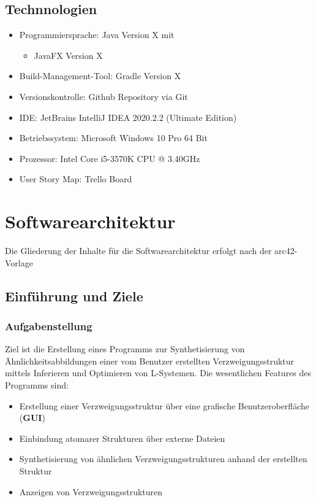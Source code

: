 \documentclass[11pt]{article}
\begin{document}
    \subsection{Technnologien}
    \begin{itemize}
        \item Programmiersprache: Java Version X mit
        \begin{itemize}
            \item JavaFX Version X
        \end{itemize}
        \item Build-Management-Tool: Gradle\cite{gradle} Version X
        \item Versionskontrolle: Github Repository\cite{github} via Git\cite{git}
        \item IDE: JetBrains IntelliJ IDEA\cite{idea} 2020.2.2 (Ultimate Edition)
        \item Betriebssystem: Microsoft Windows 10 Pro 64 Bit
        \item Prozessor: Intel Core i5-3570K CPU @ 3.40GHz
        \item User Story Map: Trello Board\cite{trello}
    \end{itemize}

    \section{Softwarearchitektur}
    Die Gliederung der Inhalte für die Softwarearchitektur erfolgt nach der arc42-Vorlage~\cite{arc42}

    \subsection{Einführung und Ziele}

    \subsubsection{Aufgabenstellung}
    Ziel ist die Erstellung eines Programms zur Synthetisierung von Ähnlichkeitsabbildungen einer vom Benutzer
    erstellten Verzweigungsstruktur mittels Inferieren und Optimieren von L-Systemen.
    Die wesentlichen Features des Programms sind:
    \begin{itemize}
        \item Erstellung einer Verzweigungsstruktur über eine grafische Benutzeroberfläche (\textbf{GUI})
        \item Einbindung atomarer Strukturen über externe Dateien
        \item Synthetisierung von ähnlichen Verzweigungsstrukturen anhand der erstellten Struktur
        \item Anzeigen von Verzweigungsstrukturen
    \end{itemize}
\end{document}
